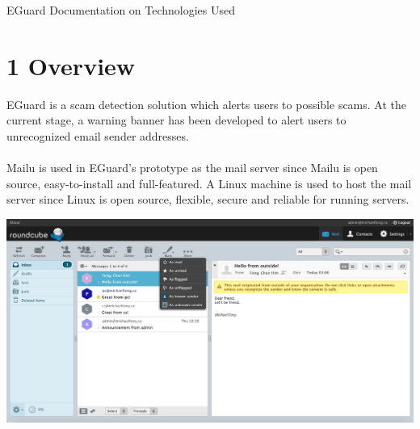 \documentclass[11pt]{article}
\begin{document}






\begin{center}
\Huge{EGuard Documentation on Technologies Used}
\end{center}

\section*{\large{1 \hspace{10pt} Overview}}
EGuard is a scam detection solution which alerts users to possible scams. At the current stage, a warning banner has been developed to alert users to unrecognized email sender addresses. \\
\\
Mailu is used in EGuard's prototype as the mail server since Mailu is open source, easy-to-install and full-featured. A Linux machine is used to host the mail server since Linux is open source, flexible, secure and reliable for running servers.

\begin{center}
	\includegraphics[width=1\columnwidth]{roundcube} %
\end{center}
\end{document}
